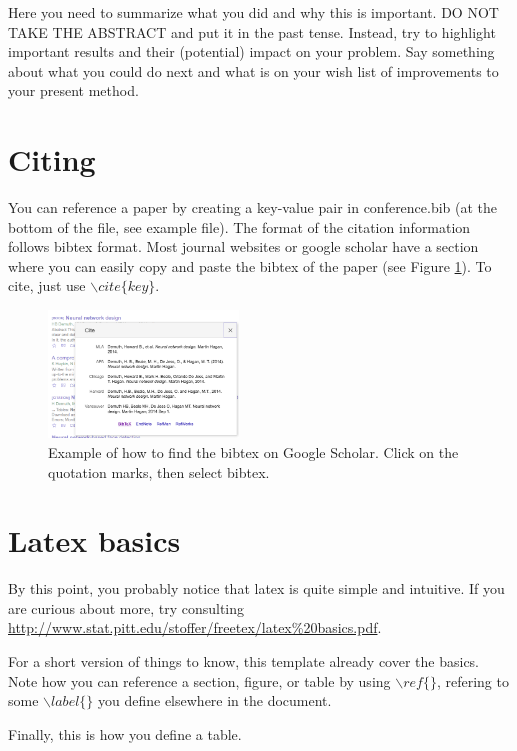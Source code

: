 \documentclass{article}
\begin{document}
Here you need to summarize what you did and why this is important.  DO
NOT TAKE THE ABSTRACT and put it in the past tense. Instead, try to
highlight important results and their (potential) impact on your
problem. Say something about what you could do next and what is on
your wish list of improvements to your present method.


\section{Citing}
\label{sec:cite}

You can reference a paper by creating a key-value pair in conference.bib (at the bottom of the file, see example file). The format of the citation information follows bibtex format. Most journal websites or google scholar have a section where you can easily copy and paste the bibtex of the paper (see Figure \ref{fig:bibtex}). To cite, just use $\backslash cite\{key\}$. 

\begin{figure}
  \centering
  \centerline{\includegraphics[width=0.45\textwidth]{bibtex.png}}
  \caption{Example of how to find the bibtex on Google Scholar. Click on the quotation marks, then select bibtex.}
  \label{fig:bibtex}
\end{figure}

\section{Latex basics}
\label{sec:latex}

By this point, you probably notice that latex is quite simple and intuitive. If you are curious about more, try consulting \url{http://www.stat.pitt.edu/stoffer/freetex/latex%20basics.pdf}.

For a short version of things to know, this template already cover the basics. Note how you can reference a section, figure, or table by using $\backslash ref\{\}$, refering to some $\backslash label\{\}$ you define elsewhere in the document.

Finally, this is how you define a table.
\end{document}
